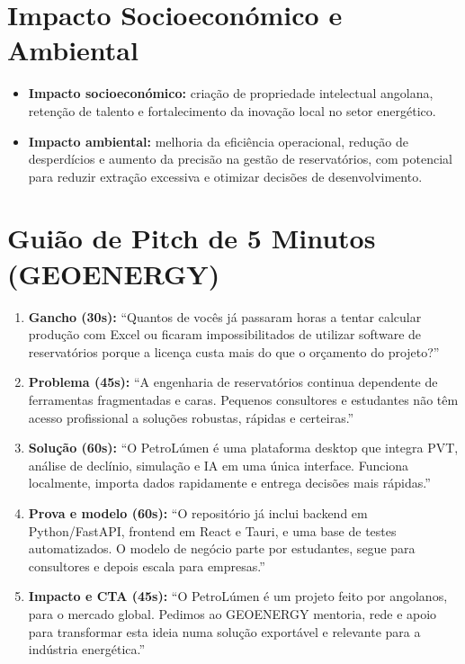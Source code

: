 \documentclass[11pt,a4paper]{article}
\begin{document}
\section{Impacto Socioeconómico e Ambiental}
\begin{itemize}
    \item \textbf{Impacto socioeconómico:} criação de propriedade intelectual angolana, retenção de talento e fortalecimento da inovação local no setor energético.
    \item \textbf{Impacto ambiental:} melhoria da eficiência operacional, redução de desperdícios e aumento da precisão na gestão de reservatórios, com potencial para reduzir extração excessiva e otimizar decisões de desenvolvimento.
\end{itemize}

\section{Guião de Pitch de 5 Minutos (GEOENERGY)}
\begin{enumerate}[leftmargin=*]
    \item \textbf{Gancho (30s):} “Quantos de vocês já passaram horas a tentar calcular produção com Excel ou ficaram impossibilitados de utilizar software de reservatórios porque a licença custa mais do que o orçamento do projeto?”
    \item \textbf{Problema (45s):} “A engenharia de reservatórios continua dependente de ferramentas fragmentadas e caras. Pequenos consultores e estudantes não têm acesso profissional a soluções robustas, rápidas e certeiras.”
    \item \textbf{Solução (60s):} “O PetroLúmen é uma plataforma desktop que integra PVT, análise de declínio, simulação e IA em uma única interface. Funciona localmente, importa dados rapidamente e entrega decisões mais rápidas.”
    \item \textbf{Prova e modelo (60s):} “O repositório já inclui backend em Python/FastAPI, frontend em React e Tauri, e uma base de testes automatizados. O modelo de negócio parte por estudantes, segue para consultores e depois escala para empresas.”
    \item \textbf{Impacto e CTA (45s):} “O PetroLúmen é um projeto feito por angolanos, para o mercado global. Pedimos ao GEOENERGY mentoria, rede e apoio para transformar esta ideia numa solução exportável e relevante para a indústria energética.”
\end{enumerate}
\end{document}
